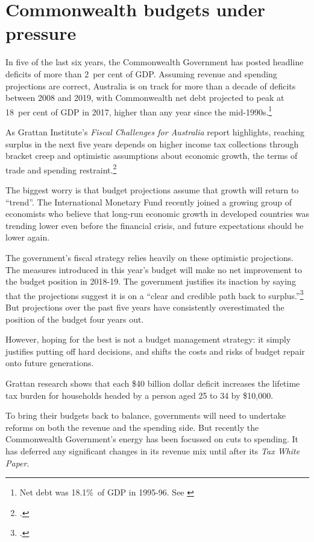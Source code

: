 \documentclass{grattan}\usepackage[]{graphicx}\usepackage[]{color}
\begin{document}
\chapter{Commonwealth budgets under pressure}
In five of the last six years, the Commonwealth Government has posted headline deficits of more than 2~per cent of GDP.
Assuming revenue and spending projections are correct, Australia is on track for more than a decade of deficits between 2008 and 2019, with Commonwealth net debt projected to peak at 18~per cent of GDP in 2017, higher than any year since the mid-1990s.\footnote{Net debt was 18.1\%\ of GDP in 1995-96. See \textcite[p.~273]{Treasury2014b}}
 
As Grattan Institute's \emph{Fiscal Challenges for Australia} report highlights, reaching surplus in the next five years depends on higher income tax collections through bracket creep and optimistic assumptions about economic growth, the terms of trade and spending restraint.\footcite{DaleyWood2015}
 
The biggest worry is that budget projections assume that growth will return to ``trend''. The International Monetary Fund recently joined a growing group of economists who believe that long-run economic growth in developed countries was trending lower even before the financial crisis, and future expectations should be lower again.
 
 
The government's fiscal strategy relies heavily on these optimistic projections. The measures introduced in this year's budget will make no net improvement to the budget position in 2018-19. The government justifies its inaction by saying that the projections suggest it is on a ``clear and credible path back to surplus.''\footcite{Hockey2015} But projections over the past five years have consistently overestimated the position of the budget four years out.
 
However, hoping for the best is not a budget management strategy: it simply justifies putting off hard decisions, and shifts the costs and risks of budget repair onto future generations.
 
Grattan research shows that each \$40 billion dollar deficit increases the lifetime tax burden for households headed by a person aged 25 to 34 by \$10,000.
 
To bring their budgets back to balance, governments will need to undertake reforms on both the revenue and the spending side. But recently the Commonwealth Government's energy has been focussed on cuts to spending.
It has deferred any significant changes in its revenue mix until after its \emph{Tax White Paper}.
 
\end{document}
